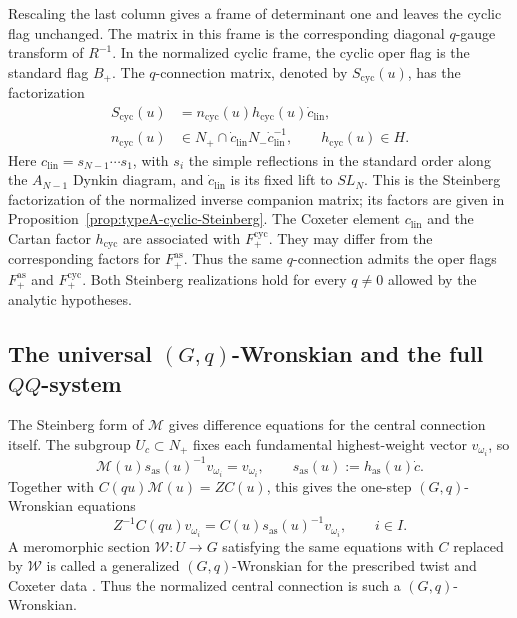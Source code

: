 \documentclass[11pt,leqno]{amsart}
\numberwithin{equation}{section}
\theoremstyle{plain}
\theoremstyle{definition}
\theoremstyle{plain}
\theoremstyle{definition}
\theoremstyle{remark}
\begin{document}
Rescaling the last column gives a frame of determinant one and leaves the cyclic flag unchanged.  The matrix in this frame is the corresponding diagonal $q$-gauge transform of $R^{-1}$.  In the normalized cyclic frame, the cyclic oper flag is the standard flag $B_+$.  The $q$-connection matrix, denoted by $S_{\mathrm{cyc}}(u)$, has the factorization
\[
 \begin{aligned}
 S_{\mathrm{cyc}}(u)
 &=n_{\mathrm{cyc}}(u)h_{\mathrm{cyc}}(u)\dot c_{\mathrm{lin}},\\
 n_{\mathrm{cyc}}(u)&\in
 N_+\cap\dot c_{\mathrm{lin}}N_-\dot c_{\mathrm{lin}}^{-1},
 \qquad h_{\mathrm{cyc}}(u)\in H.
 \end{aligned}
\]
Here $c_{\mathrm{lin}}=s_{N-1}\cdots s_1$, with $s_i$ the simple reflections in the standard order along the $A_{N-1}$ Dynkin diagram, and $\dot c_{\mathrm{lin}}$ is its fixed lift to $SL_N$.  This is the Steinberg factorization of the normalized inverse companion matrix; its factors are given in Proposition~\ref{prop:typeA-cyclic-Steinberg}.  The Coxeter element $c_{\mathrm{lin}}$ and the Cartan factor $h_{\mathrm{cyc}}$ are associated with $F_+^{\mathrm{cyc}}$. They may differ from the corresponding factors for $F_+^{\mathrm{as}}$.  Thus the same $q$-connection admits the oper flags $F_+^{\mathrm{as}}$ and $F_+^{\mathrm{cyc}}$.  Both Steinberg realizations hold for every $q\ne0$ allowed by the analytic hypotheses.

\subsection{The universal \texorpdfstring{$(G,q)$}{(G,q)}-Wronskian and the full \texorpdfstring{$QQ$}{QQ}-system}\label{sec:intro-Wronskian-QQ}

The Steinberg form of $\mathscr M$ gives difference equations for the central connection itself.  The subgroup $U_c\subset N_+$ fixes each fundamental highest-weight vector $v_{\omega_i}$, so
\[
 \mathscr M(u)s_{\mathrm{as}}(u)^{-1}v_{\omega_i}=v_{\omega_i},
 \qquad s_{\mathrm{as}}(u):=h_{\mathrm{as}}(u)\dot c.
\]
Together with $C(qu)\mathscr M(u)=ZC(u)$, this gives the one-step $(G,q)$-Wronskian equations
\begin{equation}\label{eq:intro-one-step-Wronskian}
 Z^{-1}C(qu)v_{\omega_i}
 =C(u)s_{\mathrm{as}}(u)^{-1}v_{\omega_i},
 \qquad i\in I.
\end{equation}
A meromorphic section $\mathscr W:U\to G$ satisfying the same equations with $C$ replaced by $\mathscr W$ is called a generalized $(G,q)$-Wronskian for the prescribed twist and Coxeter data \cite{KZ2021}.  Thus the normalized central connection is such a $(G,q)$-Wronskian.
\end{document}
